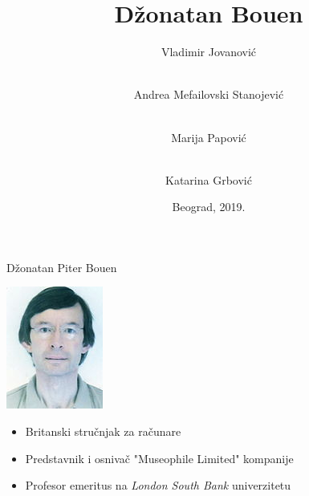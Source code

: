 \documentclass{beamer}
\begin{document}
\title{Džonatan Bouen}

\author{\flushleft Vladimir Jovanović \and\\ Andrea Mefailovski Stanojević \and\\ Marija Papović \and\\ Katarina Grbović }
\date{
	\footnotesize{Beograd, 2019.}	
}

\begin{frame}
	\thispagestyle{empty}
	\titlepage
\end{frame}

\addtocounter{framenumber}{-1}

\begin{frame}{Džonatan Piter Bouen}
    \begin{center} \includegraphics[scale=3]{Jonathan_Bowen_photograph.jpg} \end{center}
    \begin{itemize}
        \item Britanski stručnjak za računare
        \item Predstavnik i osnivač "Museophile Limited" kompanije
        \item Profesor emeritus na \textit{London South Bank} univerzitetu
    \end{itemize}
\end{frame}
\end{document}
